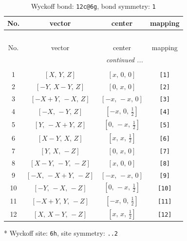 \documentclass[fleqn,8pt]{jsarticle}
\begin{document}
\begin{longtable}{cccc}
\caption{Wyckoff bond: {\tt 12c@6g}, bond symmetry: {\tt 1}}
 \\
 \hline \hline
No. & vector & center & mapping \\ \hline \endfirsthead

\multicolumn{3}{l}{\tablename\ \thetable{}} \\
 \hline \hline
No. & vector & center & mapping \\ \hline \endhead

 \hline \hline
\multicolumn{3}{r}{\footnotesize\it continued ...} \\ \endfoot

 \hline \hline
\multicolumn{3}{r}{} \\ \endlastfoot

1 & $\left[ X,\, Y,\, Z \right]$ & $\left[ x,\, 0,\, 0 \right]$ & {\tt [1]} \\ \hline
2 & $\left[ - Y,\, X - Y,\, Z \right]$ & $\left[ 0,\, x,\, 0 \right]$ & {\tt [2]} \\ \hline
3 & $\left[ - X + Y,\, - X,\, Z \right]$ & $\left[ - x,\, - x,\, 0 \right]$ & {\tt [3]} \\ \hline
4 & $\left[ - X,\, - Y,\, Z \right]$ & $\left[ - x,\, 0,\, \frac{1}{2} \right]$ & {\tt [4]} \\ \hline
5 & $\left[ Y,\, - X + Y,\, Z \right]$ & $\left[ 0,\, - x,\, \frac{1}{2} \right]$ & {\tt [5]} \\ \hline
6 & $\left[ X - Y,\, X,\, Z \right]$ & $\left[ x,\, x,\, \frac{1}{2} \right]$ & {\tt [6]} \\ \hline
7 & $\left[ Y,\, X,\, - Z \right]$ & $\left[ 0,\, x,\, 0 \right]$ & {\tt [7]} \\ \hline
8 & $\left[ X - Y,\, - Y,\, - Z \right]$ & $\left[ x,\, 0,\, 0 \right]$ & {\tt [8]} \\ \hline
9 & $\left[ - X,\, - X + Y,\, - Z \right]$ & $\left[ - x,\, - x,\, 0 \right]$ & {\tt [9]} \\ \hline
10 & $\left[ - Y,\, - X,\, - Z \right]$ & $\left[ 0,\, - x,\, \frac{1}{2} \right]$ & {\tt [10]} \\ \hline
11 & $\left[ - X + Y,\, Y,\, - Z \right]$ & $\left[ - x,\, 0,\, \frac{1}{2} \right]$ & {\tt [11]} \\ \hline
12 & $\left[ X,\, X - Y,\, - Z \right]$ & $\left[ x,\, x,\, \frac{1}{2} \right]$ & {\tt [12]} \\
\end{longtable}
* Wyckoff site: {\tt 6h}, site symmetry: {\tt ..2}
\end{document}
